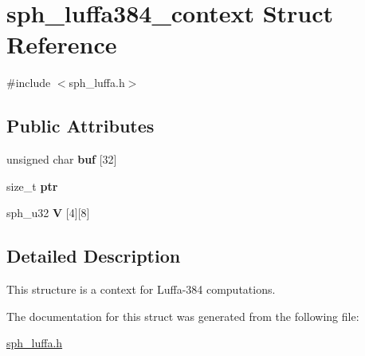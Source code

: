 \hypertarget{structsph__luffa384__context}{}\section{sph\+\_\+luffa384\+\_\+context Struct Reference}
\label{structsph__luffa384__context}


{\ttfamily \#include $<$sph\+\_\+luffa.\+h$>$}

\subsection*{Public Attributes}
\begin{DoxyCompactItemize}
\item 
\mbox{\label{structsph__luffa384__context_a48cac0d215386fd163afc273331427a1}} 
unsigned char {\bfseries buf} \mbox{[}32\mbox{]}
\item 
\mbox{\label{structsph__luffa384__context_ab0c41fc53539b3b1499e0900459e4311}} 
size\+\_\+t {\bfseries ptr}
\item 
\mbox{\label{structsph__luffa384__context_a1e3f11fe357732f2e5aee05ad5c6e6d9}} 
sph\+\_\+u32 {\bfseries V} \mbox{[}4\mbox{]}\mbox{[}8\mbox{]}
\end{DoxyCompactItemize}


\subsection{Detailed Description}
This structure is a context for Luffa-\/384 computations. 

The documentation for this struct was generated from the following file\+:\begin{DoxyCompactItemize}
\item 
\mbox{\hyperlink{sph__luffa_8h}{sph\+\_\+luffa.\+h}}\end{DoxyCompactItemize}
